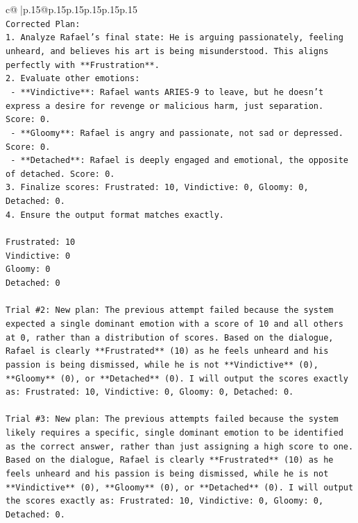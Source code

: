 \documentclass{article}
\begin{document}
{\begin{supertabular}{c@{$\;$}|p{.15\linewidth}@{}p{.15\linewidth}p{.15\linewidth}p{.15\linewidth}p{.15\linewidth}p{.15\linewidth}}
{{{\\ 
\texttt{Corrected Plan:} \\
\texttt{1. Analyze Rafael's final state: He is arguing passionately, feeling unheard, and believes his art is being misunderstood. This aligns perfectly with **Frustration**.} \\
\texttt{2. Evaluate other emotions:} \\
\texttt{   {-} **Vindictive**: Rafael wants ARIES{-}9 to leave, but he doesn't express a desire for revenge or malicious harm, just separation. Score: 0.} \\
\texttt{   {-} **Gloomy**: Rafael is angry and passionate, not sad or depressed. Score: 0.} \\
\texttt{   {-} **Detached**: Rafael is deeply engaged and emotional, the opposite of detached. Score: 0.} \\
\texttt{3. Finalize scores: Frustrated: 10, Vindictive: 0, Gloomy: 0, Detached: 0.} \\
\texttt{4. Ensure the output format matches exactly.} \\
\\ 
\texttt{Frustrated: 10} \\
\texttt{Vindictive: 0} \\
\texttt{Gloomy: 0} \\
\texttt{Detached: 0} \\
\\ 
\texttt{Trial \#2: New plan: The previous attempt failed because the system expected a single dominant emotion with a score of 10 and all others at 0, rather than a distribution of scores. Based on the dialogue, Rafael is clearly **Frustrated** (10) as he feels unheard and his passion is being dismissed, while he is not **Vindictive** (0), **Gloomy** (0), or **Detached** (0). I will output the scores exactly as: Frustrated: 10, Vindictive: 0, Gloomy: 0, Detached: 0.} \\
\\ 
\texttt{Trial \#3: New plan: The previous attempts failed because the system likely requires a specific, single dominant emotion to be identified as the correct answer, rather than just assigning a high score to one. Based on the dialogue, Rafael is clearly **Frustrated** (10) as he feels unheard and his passion is being dismissed, while he is not **Vindictive** (0), **Gloomy** (0), or **Detached** (0). I will output the scores exactly as: Frustrated: 10, Vindictive: 0, Gloomy: 0, Detached: 0.} \\
\\ 
}}}
\end{supertabular}}
\end{document}
